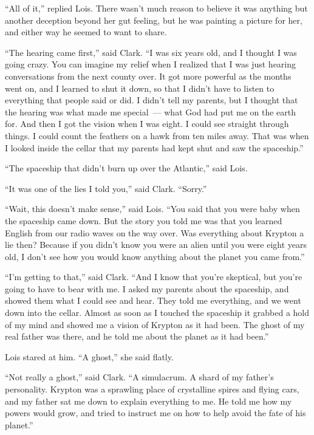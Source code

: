 ``All of it,'' replied Lois. There wasn't much reason to believe it was
anything but another deception beyond her gut feeling, but he was
painting a picture for her, and either way he seemed to want to share.

``The hearing came first,'' said Clark. ``I was six years old, and I
thought I was going crazy. You can imagine my relief when I realized
that I was just hearing conversations from the next county over. It got
more powerful as the months went on, and I learned to shut it down, so
that I didn't have to listen to everything that people said or did. I
didn't tell my parents, but I thought that the hearing was what made me
special~--- what God had put me on the earth for. And then I got the
vision when I was eight. I could see straight through things. I could
count the feathers on a hawk from ten miles away. That was when I looked
inside the cellar that my parents had kept shut and saw the spaceship.''

``The spaceship that didn't burn up over the Atlantic,'' said Lois.

``It was one of the lies I told you,'' said Clark. ``Sorry.''

``Wait, this doesn't make sense,'' said Lois. ``You said that you were
baby when the spaceship came down. But the story you told me was that
you learned English from our radio waves on the way over. Was everything
about Krypton a lie then? Because if you didn't know you were an alien
until you were eight years old, I don't see how you would know anything
about the planet you came from.''

``I'm getting to that,'' said Clark. ``And I know that you're skeptical,
but you're going to have to bear with me. I asked my parents about the
spaceship, and showed them what I could see and hear. They told me
everything, and we went down into the cellar. Almost as soon as I
touched the spaceship it grabbed a hold of my mind and showed me a
vision of Krypton as it had been. The ghost of my real father was there,
and he told me about the planet as it had been.''

Lois stared at him. ``A ghost,'' she said flatly.

``Not really a ghost,'' said Clark. ``A simulacrum. A shard of my
father's personality. Krypton was a sprawling place of crystalline
spires and flying cars, and my father sat me down to explain everything
to me. He told me how my powers would grow, and tried to instruct me on
how to help avoid the fate of his planet.''

